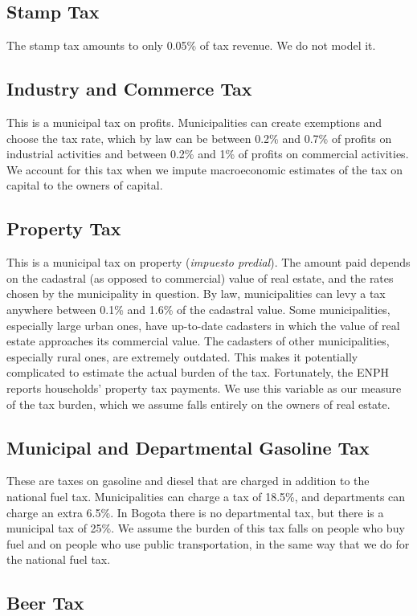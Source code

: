\documentclass[12pt]{article}
\begin{document}
\begin{appendices}
\subsection{Stamp Tax}
The stamp tax amounts to only 0.05\% of tax revenue.
We do not model it.

\subsection{Industry and Commerce Tax}
This is a municipal tax on profits.
Municipalities can create exemptions and choose the tax rate,
which by law can be between 0.2\% and 0.7\%
of profits on industrial activities
and between 0.2\% and 1\% of profits on commercial activities.
We account for this tax when we
impute macroeconomic estimates of the tax on capital
to the owners of capital.

\subsection{Property Tax}
This is a municipal tax on property (\textit{impuesto predial}).
The amount paid depends on the cadastral
(as opposed to commercial) value of real estate,
and the rates chosen by the municipality in question.
By law, municipalities can levy a tax anywhere
between 0.1\% and 1.6\% of the cadastral value.
Some municipalities, especially large urban ones,
have up-to-date cadasters in which
the value of real estate approaches its commercial value.
The cadasters of other municipalities,
especially rural ones, are extremely outdated.
This makes it potentially complicated
to estimate the actual burden of the tax.
Fortunately, the ENPH reports households' property tax payments.
We use this variable as our measure of the tax burden,
which we assume falls entirely on the owners of real estate.

\subsection{Municipal and Departmental Gasoline Tax}
These are taxes on gasoline and diesel
that are charged in addition to the national fuel tax.
Municipalities can charge a tax of 18.5\%,
and departments can charge an extra 6.5\%.
In Bogota there is no departmental tax,
but there is a municipal tax of 25\%.
We assume the burden of this tax falls on people who buy fuel
and on people who use public transportation,
in the same way that we do for the national fuel tax.

\subsection{Beer Tax}

\end{appendices}
\end{document}
